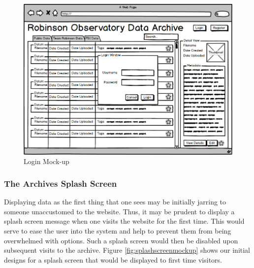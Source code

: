 \documentclass[12pt]{article}
\begin{document}
\begin{figure}[h]
	\centering
	\includegraphics[width=\linewidth]{login}
	\caption{Login Mock-up}
	\label{fig:loginmockup}
\end{figure}

\subsubsection{The Archives Splash Screen}

Displaying data as the first thing that one sees may be initially jarring to someone unaccustomed to the website. Thus, it may be prudent to display a splash screen message when one visits the website for the first time. This would serve to ease the user into the system and help to prevent them from being overwhelmed with options. Such a splash screen would then be disabled upon subsequent visits to the archive. Figure \ref{fig:splashscreenmockup} shows our initial designs for a splash screen that would be displayed to first time visitors.
\end{document}
